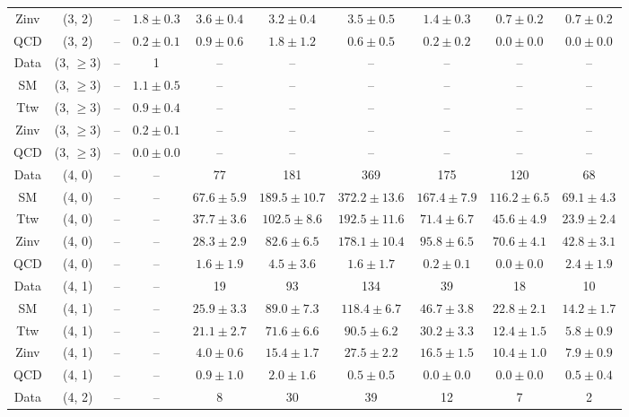 \begin{table}[h!]
{\begin{tabular}{cccccccccc}
	Zinv & (3, 2) & -- & $1.8\pm 0.3$ & $3.6\pm 0.4$ & $3.2\pm 0.4$ & $3.5\pm 0.5$ & $1.4\pm 0.3$ & $0.7\pm 0.2$ & $0.7\pm 0.2$ \\[0.5ex] 
	QCD & (3, 2) & -- & $0.2\pm 0.1$ & $0.9\pm 0.6$ & $1.8\pm 1.2$ & $0.6\pm 0.5$ & $0.2\pm 0.2$ & $0.0\pm 0.0$ & $0.0\pm 0.0$ \\[0.5ex] 
	Data & (3, $\ge3$) & -- & 1 & -- & -- & -- & -- & -- & -- \\[0.5ex] 
	SM & (3, $\ge3$) & -- & $1.1\pm 0.5$ & -- & -- & -- & -- & -- & -- \\[0.5ex] 
	Ttw & (3, $\ge3$) & -- & $0.9\pm 0.4$ & -- & -- & -- & -- & -- & -- \\[0.5ex] 
	Zinv & (3, $\ge3$) & -- & $0.2\pm 0.1$ & -- & -- & -- & -- & -- & -- \\[0.5ex] 
	QCD & (3, $\ge3$) & -- & $0.0\pm 0.0$ & -- & -- & -- & -- & -- & -- \\[0.5ex] 
	Data & (4, 0) & -- & -- & 77 & 181 & 369 & 175 & 120 & 68 \\[0.5ex] 
	SM & (4, 0) & -- & -- & $67.6\pm 5.9$ & $189.5\pm 10.7$ & $372.2\pm 13.6$ & $167.4\pm 7.9$ & $116.2\pm 6.5$ & $69.1\pm 4.3$ \\[0.5ex] 
	Ttw & (4, 0) & -- & -- & $37.7\pm 3.6$ & $102.5\pm 8.6$ & $192.5\pm 11.6$ & $71.4\pm 6.7$ & $45.6\pm 4.9$ & $23.9\pm 2.4$ \\[0.5ex] 
	Zinv & (4, 0) & -- & -- & $28.3\pm 2.9$ & $82.6\pm 6.5$ & $178.1\pm 10.4$ & $95.8\pm 6.5$ & $70.6\pm 4.1$ & $42.8\pm 3.1$ \\[0.5ex] 
	QCD & (4, 0) & -- & -- & $1.6\pm 1.9$ & $4.5\pm 3.6$ & $1.6\pm 1.7$ & $0.2\pm 0.1$ & $0.0\pm 0.0$ & $2.4\pm 1.9$ \\[0.5ex] 
	Data & (4, 1) & -- & -- & 19 & 93 & 134 & 39 & 18 & 10 \\[0.5ex] 
	SM & (4, 1) & -- & -- & $25.9\pm 3.3$ & $89.0\pm 7.3$ & $118.4\pm 6.7$ & $46.7\pm 3.8$ & $22.8\pm 2.1$ & $14.2\pm 1.7$ \\[0.5ex] 
	Ttw & (4, 1) & -- & -- & $21.1\pm 2.7$ & $71.6\pm 6.6$ & $90.5\pm 6.2$ & $30.2\pm 3.3$ & $12.4\pm 1.5$ & $5.8\pm 0.9$ \\[0.5ex] 
	Zinv & (4, 1) & -- & -- & $4.0\pm 0.6$ & $15.4\pm 1.7$ & $27.5\pm 2.2$ & $16.5\pm 1.5$ & $10.4\pm 1.0$ & $7.9\pm 0.9$ \\[0.5ex] 
	QCD & (4, 1) & -- & -- & $0.9\pm 1.0$ & $2.0\pm 1.6$ & $0.5\pm 0.5$ & $0.0\pm 0.0$ & $0.0\pm 0.0$ & $0.5\pm 0.4$ \\[0.5ex] 
	Data & (4, 2) & -- & -- & 8 & 30 & 39 & 12 & 7 & 2 \\[0.5ex] 

\end{tabular}}
\end{table}
